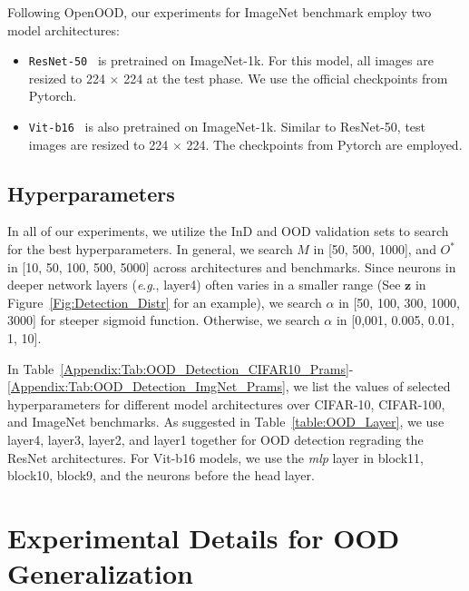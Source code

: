 \documentclass{article} \usepackage{iclr2024_conference,times}
\newcommand{\eg}{\textit{e}.\textit{g}.}
\begin{document}
Following OpenOOD, our experiments for ImageNet benchmark employ two model architectures: 
\begin{itemize}
	\item {\texttt{ResNet-50}}~\citep{tech:ResNet} is pretrained on ImageNet-1k. For this model, all images are resized to 224 $\times$ 224 at the test phase. We use the official checkpoints from Pytorch.

	\item {\texttt{Vit-b16}}~\citep{tech:ViT} is also pretrained on ImageNet-1k. Similar to ResNet-50, test images are resized to 224 $\times$ 224. The checkpoints from Pytorch are employed.

\end{itemize}




\subsection{Hyperparameters}
\label{Appendix:OOD_Detection:HP}
In all of our experiments, we utilize the InD and OOD validation sets to search for the best hyperparameters. In general, we search $M$ in [50, 500, 1000], and $O^*$ in [10, 50, 100, 500, 5000] across architectures and benchmarks. Since neurons in deeper network layers (\eg, layer4) often varies in a smaller range (See $\mathbf{z}$ in Figure~\ref{Fig:Detection_Distr} for an example), we search $\alpha$ in [50, 100, 300, 1000, 3000] for steeper sigmoid function. Otherwise, we search $\alpha$ in [0,001, 0.005, 0.01, 1, 10]. 

In Table~\ref{Appendix:Tab:OOD_Detection_CIFAR10_Prams}-\ref{Appendix:Tab:OOD_Detection_ImgNet_Prams}, we list the values of selected hyperparameters for different model architectures over CIFAR-10, CIFAR-100, and ImageNet benchmarks. As suggested in Table~\ref{table:OOD_Layer}, we use layer4, layer3, layer2, and layer1 together for OOD detection regrading the ResNet architectures. For Vit-b16 models, we use the \textit{mlp} layer in block11, block10, block9, and the neurons before the head layer.












\section{Experimental Details for OOD Generalization}
\label{Appendix:OOD_Generalization_Details}
\end{document}

